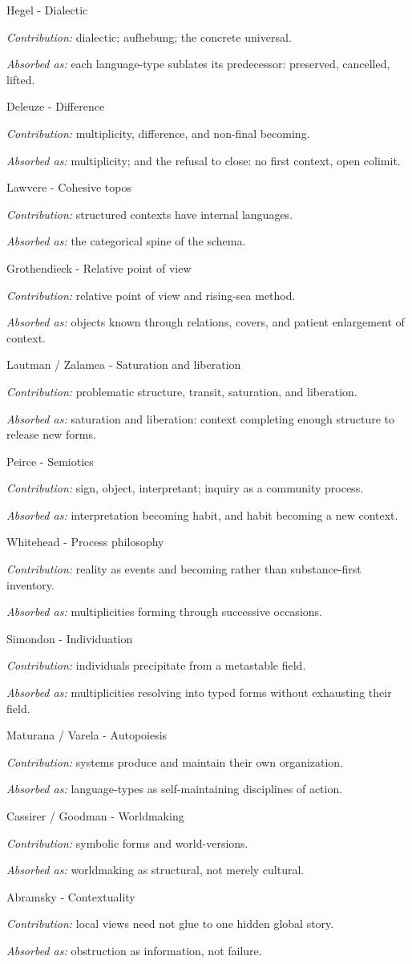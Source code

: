 \documentclass[11pt]{article}
\newenvironment{annotatedlist}{%
  \begin{description}[
    style=nextline,
    leftmargin=0pt,
    labelindent=0pt,
    labelsep=0pt,
    font=\normalfont\bfseries,
    itemsep=0.85em,
    topsep=0.35em
  ]%
}{\end{description}}
\newcommand{\annotation}[2]{\par\textit{#1:} #2}
\begin{document}
\begin{annotatedlist}
\item[Hegel - Dialectic]
\annotation{Contribution}{dialectic; aufhebung; the concrete universal.}
\annotation{Absorbed as}{each language-type sublates its predecessor: preserved, cancelled, lifted.}

\item[Deleuze - Difference]
\annotation{Contribution}{multiplicity, difference, and non-final becoming.}
\annotation{Absorbed as}{multiplicity; and the refusal to close: no first context, open colimit.}

\item[Lawvere - Cohesive topos]
\annotation{Contribution}{structured contexts have internal languages.}
\annotation{Absorbed as}{the categorical spine of the schema.}

\item[Grothendieck - Relative point of view]
\annotation{Contribution}{relative point of view and rising-sea method.}
\annotation{Absorbed as}{objects known through relations, covers, and patient enlargement of context.}

\item[Lautman / Zalamea - Saturation and liberation]
\annotation{Contribution}{problematic structure, transit, saturation, and liberation.}
\annotation{Absorbed as}{saturation and liberation: context completing enough structure to release new forms.}

\item[Peirce - Semiotics]
\annotation{Contribution}{sign, object, interpretant; inquiry as a community process.}
\annotation{Absorbed as}{interpretation becoming habit, and habit becoming a new context.}

\item[Whitehead - Process philosophy]
\annotation{Contribution}{reality as events and becoming rather than substance-first inventory.}
\annotation{Absorbed as}{multiplicities forming through successive occasions.}

\item[Simondon - Individuation]
\annotation{Contribution}{individuals precipitate from a metastable field.}
\annotation{Absorbed as}{multiplicities resolving into typed forms without exhausting their field.}

\item[Maturana / Varela - Autopoiesis]
\annotation{Contribution}{systems produce and maintain their own organization.}
\annotation{Absorbed as}{language-types as self-maintaining disciplines of action.}

\item[Cassirer / Goodman - Worldmaking]
\annotation{Contribution}{symbolic forms and world-versions.}
\annotation{Absorbed as}{worldmaking as structural, not merely cultural.}

\item[Abramsky - Contextuality]
\annotation{Contribution}{local views need not glue to one hidden global story.}
\annotation{Absorbed as}{obstruction as information, not failure.}
\end{annotatedlist}
\end{document}
